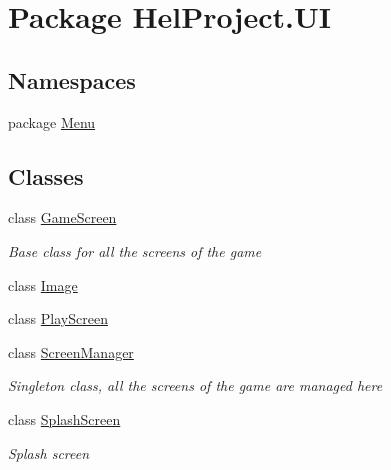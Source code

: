 \hypertarget{namespace_hel_project_1_1_u_i}{}\section{Package Hel\+Project.\+U\+I}
\label{namespace_hel_project_1_1_u_i}
\subsection*{Namespaces}
\begin{DoxyCompactItemize}
\item 
package \hyperlink{namespace_hel_project_1_1_u_i_1_1_menu}{Menu}
\end{DoxyCompactItemize}
\subsection*{Classes}
\begin{DoxyCompactItemize}
\item 
class \hyperlink{class_hel_project_1_1_u_i_1_1_game_screen}{Game\+Screen}
\begin{DoxyCompactList}\small\item\em Base class for all the screens of the game \end{DoxyCompactList}\item 
class \hyperlink{class_hel_project_1_1_u_i_1_1_image}{Image}
\item 
class \hyperlink{class_hel_project_1_1_u_i_1_1_play_screen}{Play\+Screen}
\item 
class \hyperlink{class_hel_project_1_1_u_i_1_1_screen_manager}{Screen\+Manager}
\begin{DoxyCompactList}\small\item\em Singleton class, all the screens of the game are managed here \end{DoxyCompactList}\item 
class \hyperlink{class_hel_project_1_1_u_i_1_1_splash_screen}{Splash\+Screen}
\begin{DoxyCompactList}\small\item\em Splash screen \end{DoxyCompactList}\end{DoxyCompactItemize}
